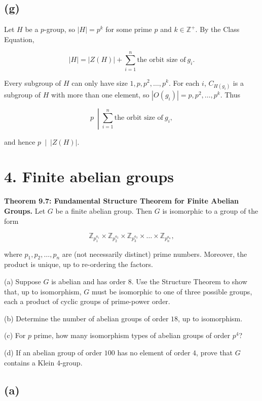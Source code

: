\subsection{(g)}

Let \(H\) be a \(p\)-group, so \(|H| = p^{k}\) for some prime \(p\) and \(k \in \mathbb{Z}^{+}\). By the Class Equation,

\[|H| = \left| {Z(H)} \right| + \sum\limits_{i = 1}^{n}\text{the orbit size of}\ g_{i}.\]

Every subgroup of \(H\) can only have size \(1,p,p^{2},\ldots,p^{k}\). For each \(i\), \(C_{H{(g_{i})}}\) is a subgroup of \(H\) with more than one element, so \(\left| {O\left( g_{i} \right)} \right| = p,p^{2},\ldots,p^{k}\). Thus

\[\left. p\  \middle| \sum\limits_{i = 1}^{n}\text{the orbit size of}\ g_{i}, \right.\]

and hence \(\left. p\  \middle| \ \left| {Z(H)} \right| \right.\).

\section{4. Finite abelian groups}

\textbf{Theorem 9.7: Fundamental Structure Theorem for Finite Abelian Groups.} Let \(G\) be a finite abelian group. Then \(G\) is isomorphic to a group of the form

\[\mathbb{Z}_{p_{1}^{a_{1}}} \times \mathbb{Z}_{p_{2}^{a_{2}}} \times \mathbb{Z}_{p_{3}^{a_{3}}} \times \ldots \times \mathbb{Z}_{p_{n}^{a_{n}}},\]

where \(p_{1},p_{2},\ldots,p_{n}\) are (not necessarily distinct) prime numbers. Moreover, the product is unique, up to re-ordering the factors.

(a) Suppose \(G\) is abelian and has order \(8\). Use the Structure Theorem to show that, up to isomorphism, \(G\) must be isomorphic to one of three possible groups, each a product of cyclic groups of prime-power order.

(b) Determine the number of abelian groups of order \(18\), up to isomorphism.

(c) For \(p\) prime, how many isomorphism types of abelian groups of order \(p^{4}\)?

(d) If an abelian group of order \(100\) has no element of order \(4\), prove that \(G\) contains a Klein 4-group.

\subsection{(a)}

